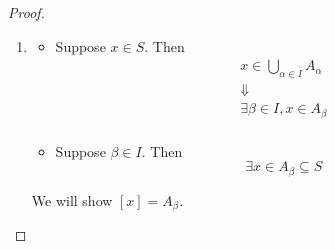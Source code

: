 \begin{proof}
\begin{enumerate}[label=\textbf{(\Alph*)}]
\begin{itemize}
\begin{itemize}
                  \end{itemize}
                  Then
                  \begin{itemize}
                    \item $\exists \alpha \in I, x \in A_{\alpha} \land y \in A_{\alpha}$
                    \item $\exists \beta \in I, y \in A_{\beta} \land z \in A_{\beta}$
                  \end{itemize}
                  Therefore,
                  \[
                    \begin{array}{c}
                      y \in A_{\alpha} \land y \in A_{\beta}  \\
                      \Downarrow                              \\
                      A_{\alpha} \cap A_{\beta} \neq \vnot    \\
                      \Downarrow                              \\
                      \alpha = \beta                          \\
                      \Downarrow                              \\
                      x \in A_{\alpha} \land z \in A_{\alpha} \\
                      \Downarrow                              \\
                      x \sim z
                    \end{array}
                  \]
          \end{itemize}
    \item \begin{itemize}
            \item Suppose $x \in S$. Then
                  \[
                    \begin{array}{c}
                      x \in \bigcup_{\alpha \in I} A_{\alpha} \\
                      \Downarrow                              \\
                      \exists \beta \in I, x \in A_{\beta}    \\
                    \end{array}
                  \]
            \item Suppose $\beta \in I$. Then
                  \[
                    \exists x \in A_{\beta} \subseteq S
                  \]
          \end{itemize}
          We will show $[x] = A_{\beta}$.

\end{enumerate}
\end{proof}
